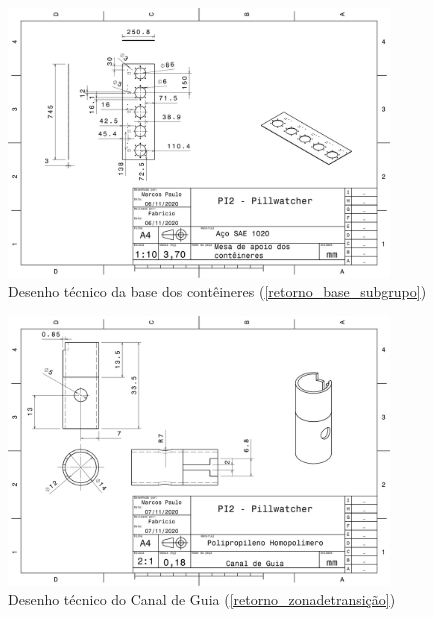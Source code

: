 \begin{apendicesenv}
\begin{figure}[H]
    \centering
    \includegraphics[width=0.9\textwidth]{figuras/estrutura/Desenhos/Base_Containers.pdf}
    \caption{Desenho técnico da base dos contêineres (\ref{retorno_base_subgrupo})}
    \label{fig:base_subgrupo}
\end{figure}

\begin{figure}[H]
    \centering
    \includegraphics[width=0.9\textwidth]{figuras/estrutura/Desenhos/Canal de Guia.pdf}
    \caption{Desenho técnico do Canal de Guia (\ref{retorno_zonadetransição})}
    \label{fig:canalguia}
\end{figure}


\end{apendicesenv}
